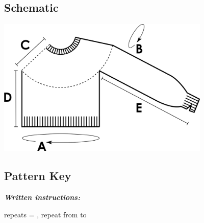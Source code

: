 \documentclass[12pt]{article}
\newcommand{\vocab}[1]{\emph{\textbf{#1}}} %
\renewcommand{\repeat}[1]{\textbf{\textasteriskcentered[#1]}, repeat from \textasteriskcentered \hspace{1pt}} %
\newcommand{\blank}{\underline{\hspace{2em}} } %
\begin{document}
\begin{multicols}{2}
\section*{Schematic}
\includegraphics[width=4in]{schematic.png}



\columnbreak

\subsection*{Pattern Key}


\vocab{Written instructions:} 

repeats = \repeat{stitches} to \blank


\end{multicols}
\end{document}
